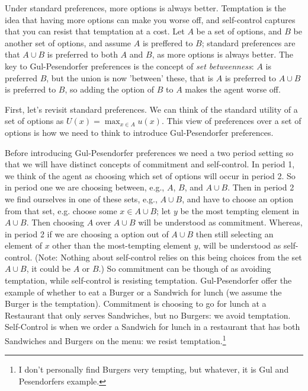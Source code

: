 \label{app:GulPesendorfer}
Under standard preferences, more options is always better. Temptation is the idea that having more options can make you worse off, and self-control captures that you can resist that temptation at a cost. Let $A$ be a set of options, and $B$ be another set of options, and assume $A$ is preffered to $B$; standard preferences are that $A \cup B$ is preferred to both $A$ and $B$, as more options is always better. The key to Gul-Pesendorfer preferences is the concept of \textit{set betweenness}: $A$ is preferred $B$, but the union is now 'between' these, that is $A$ is preferred to $A\cup B$ is preferred to $B$, so adding the option of $B$ to $A$ makes the agent worse off.

First, let's revisit standard preferences. We can think of the standard utility of a set of options as $U(x)=\max_{x \in A} u(x)$. This view of preferences over a set of options is how we need to think to introduce Gul-Pesendorfer preferences.

Before introducing Gul-Pesendorfer preferences we need a two period setting so that we will have distinct concepts of commitment and self-control. In period 1, we think of the agent as choosing which set of options will occur in period 2. So in period one we are choosing between, e.g., $A$, $B$, and $A\cup B$. Then in period 2 we find ourselves in one of these sets, e.g., $A \cup B$, and have to choose an option from that set, e.g. choose some $x \in A \cup B$; let $y$ be the most tempting element in $A \cup B$. Then choosing $A$ over $A \cup B$ will be understood as commitment. Whereas, in period 2 if we are choosing a option out of $A\cup B$ then still selecting an element of $x$ other than the most-tempting element $y$, will be understood as self-control. (Note: Nothing about self-control relies on this being choices from the set $A \cup B$, it could be $A$ or $B$.) So commitment can be though of as avoiding temptation, while self-control is resisting temptation. Gul-Pesendorfer offer the example of whether to eat a Burger or a Sandwich for lunch (we assume the Burger is the temptation). Commitment is choosing to go for lunch at a Restaurant that only serves Sandwiches, but no Burgers: we avoid temptation. Self-Control is when we order a Sandwich for lunch in a restaurant that has both Sandwiches and Burgers on the menu: we resist temptation.\footnote{I don't personally find Burgers very tempting, but whatever, it is Gul and Pesendorfers example.}

